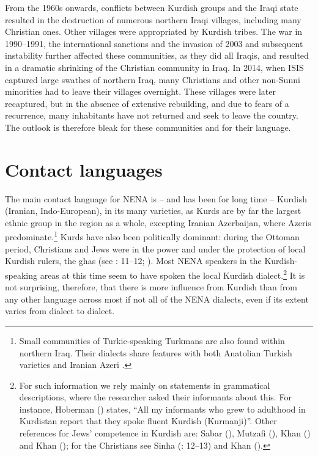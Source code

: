 \documentclass[output=paper]{langsci/langscibook}
\begin{document}
From the 1960s onwards, conflicts between Kurdish groups and the Iraqi state resulted in the destruction of numerous northern Iraqi villages, including many Christian ones. Other villages were appropriated by Kurdish tribes. The war in 1990–1991, the international sanctions and the invasion of 2003 and subsequent instability further affected these communities, as they did all Iraqis, and resulted in a dramatic shrinking of the Christian community in Iraq. In 2014, when ISIS captured large swathes of northern Iraq, many Christians and other non-Sunni minorities had to leave their villages overnight. These villages were later recaptured, but in the absence of extensive rebuilding, and due to fears of a recurrence, many inhabitants have not returned and seek to leave the country. The outlook is therefore bleak for these communities and for their language.

\section{\label{bkm:Ref534214034}Contact languages}

The main contact language for NENA is – and has been for long time – Kurdish (Iranian, Indo-European), in its many varieties, as Kurds are by far the largest ethnic group in the region as a whole, excepting Iranian Azerbaijan, where Azeris predominate.\footnote{Small communities of Turkic-speaking Turkmans are also found within northern Iraq. Their dialects share features with both Anatolian Turkish varieties and Iranian Azeri \citep{Bulut2007}.} Kurds have also been politically dominant: during the Ottoman period, Christians and Jews were in the power and under the protection of local Kurdish rulers, the ghas (see \citealt{Sinha2000}: 11–12; \citealt[223]{BrauerPatai1993}). Most NENA speakers in the Kurdish-speaking areas at this time seem to have spoken the local Kurdish dialect.\footnote{For such information we rely mainly on statements in grammatical descriptions, where the researcher asked their informants about this. For instance, Hoberman (\citeyear[9]{Hoberman1989}) states, ``All my informants who grew to adulthood in Kurdistan report that they spoke fluent Kurdish (Kurmanji)''. Other references for Jews’ competence in Kurdish are: Sabar (\citeyear[216]{Sabar1978}), Mutzafi (\citeyear[5]{Mutzafi2004}), Khan (\citeyear[198]{Khan2007}) and Khan (\citeyear[11]{Khan2009}); for the Christians see Sinha (\citeyear{Sinha2000}: 12–13) and Khan (\citeyear[18]{Khan2008}).} It is not surprising, therefore, that there is more influence from Kurdish than from any other language across most if not all of the NENA dialects, even if its extent varies from dialect to dialect.
\end{document}
